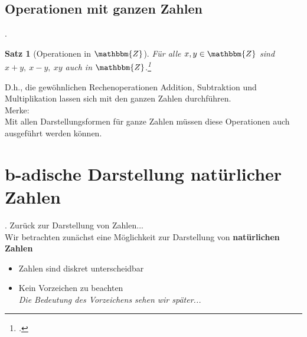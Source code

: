 \documentclass{beamer}
\newcommand{\N}{\mathbbm{N}} %
\newcommand{\Z}{\mathbbm{Z}} %
\newtheorem{satz}{Satz}[section]
\newcommand{\secframe}{\begin{frame}{\insertsectionnumber. \insertsection}}
\newcommand{\subsecframe}{\begin{frame}{\insertsectionnumber.\insertsubsectionnumber \ \insertsubsection}}
\begin{document}
    \subsection{Operationen mit ganzen Zahlen}
        \subsecframe
            \begin{satz}[Operationen in $\Z$]
                Für alle $x,y\in \Z$ sind $x+y,~x-y,~xy$ auch in $\Z$.\footcite{grigor2024}
            \end{satz}
            D.h., die gewöhnlichen Rechenoperationen Addition, Subtraktion und Multiplikation lassen sich mit den ganzen Zahlen durchführen. \\
            Merke: \\
            Mit allen Darstellungsformen für ganze Zahlen müssen diese Operationen auch ausgeführt werden können.
        \end{frame}

    
    


\section{b-adische Darstellung natürlicher Zahlen}

    \secframe
        Zurück zur Darstellung von Zahlen... \\
        Wir betrachten zunächst eine Möglichkeit zur Darstellung von \textbf{natürlichen Zahlen} \\
        \begin{itemize}
            \item Zahlen sind diskret unterscheidbar
            \item Kein Vorzeichen zu beachten \\
                \textit{Die Bedeutung des Vorzeichens sehen wir später...}
        \end{itemize}
    \end{frame}
\end{document}
